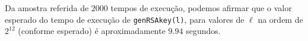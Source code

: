 \documentclass[dvipsnames]{article}
\begin{document}
\begin{multicols}{2}
  \vskip 0.2cm
  
  \noindent {}
  
  Da amostra referida de $2000$ tempos de execução, podemos afirmar que o valor esperado do tempo de execução de \texttt{genRSAkey(l)}, para valores de $\ell$ na ordem de $2^{12}$ (conforme esperado) é aproximadamente $9.94$ segundos.

  
  
  
\end{multicols}
\end{document}
